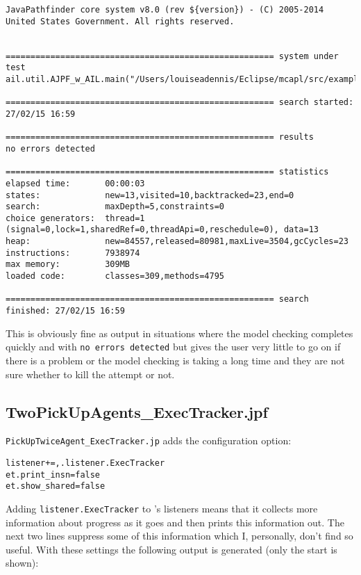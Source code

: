 \documentclass[a4]{article}
\begin{document}
\begin{verbatim}
JavaPathfinder core system v8.0 (rev ${version}) - (C) 2005-2014 United States Government. All rights reserved.


====================================================== system under test
ail.util.AJPF_w_AIL.main("/Users/louiseadennis/Eclipse/mcapl/src/examples/gwendolen/ajpf_tutorials/tutorial2/TwoPickUpAgents.ail","/Users/louiseadennis/Eclipse/mcapl/src/examples/gwendolen/ajpf_tutorials/tutorial2/PickUpAgent.psl","1")

====================================================== search started: 27/02/15 16:59

====================================================== results
no errors detected

====================================================== statistics
elapsed time:       00:00:03
states:             new=13,visited=10,backtracked=23,end=0
search:             maxDepth=5,constraints=0
choice generators:  thread=1 (signal=0,lock=1,sharedRef=0,threadApi=0,reschedule=0), data=13
heap:               new=84557,released=80981,maxLive=3504,gcCycles=23
instructions:       7938974
max memory:         309MB
loaded code:        classes=309,methods=4795

====================================================== search finished: 27/02/15 16:59
\end{verbatim}

This is obviously fine as output in situations where the model checking completes quickly and with \texttt{no errors detected} but gives the user very little to go on if there is a problem or the model checking is taking a long time and they are not sure whether to kill the attempt or not.

\subsection{TwoPickUpAgents\_ExecTracker.jpf}

\texttt{PickUpTwiceAgent\_ExecTracker.jp} adds the configuration option:

\begin{verbatim}
listener+=,.listener.ExecTracker
et.print_insn=false
et.show_shared=false
\end{verbatim}

Adding \texttt{listener.ExecTracker} to \jpf's listeners means that it collects more information about progress as it goes and then prints this information out.  The next two lines suppress some of this information which I, personally, don't find so useful.  With these settings the following output is generated (only the start is shown):
\end{document}
